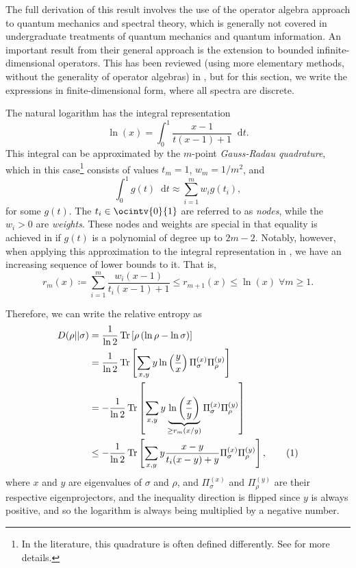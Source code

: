 \documentclass[10pt, a4paper]{article}
\numberwithin{equation}{section} %
\theoremstyle{definition}
\theoremstyle{plain}
\newcommand{\usenumber}{%
  \refstepcounter{equation}\tag{\theequation}
}
\newcommand{\dif}{\mathop{}\!\mathrm{d}} %
\newcommand{\?}{\mathrel{?}} %
\newcommand{\Tr}[2][]{\mathop{\mathrm{Tr}#1}\left[ #2 \right]} %
\begin{document}
    The full derivation of this result involves the use of the operator algebra approach to quantum mechanics and spectral theory, which is generally not covered in undergraduate treatments of quantum mechanics and quantum information. An important result from their general approach is the extension to bounded infinite-dimensional operators. This has been reviewed (using more elementary methods, without the generality of operator algebras) in , but for this section, we write the expressions in finite-dimensional form, where all spectra are discrete.

    The natural logarithm has the integral representation
    \begin{equation}
      \ln\left(x\right) = \int_{0}^{1} \frac{x-1}{t(x-1) + 1} \dif{t}.\label{eqn:integral_log}
    \end{equation}
    This integral can be approximated by the \(m\)-point \emph{Gauss-Radau quadrature}, which in this case\footnote{In the literature, this quadrature is often defined differently. See  for more details.} consists of values \(t_m = 1\), \(w_m = 1/m^2\), and
    \begin{equation}\label{eqn:grapprox}
      \int_{0}^{1} g(t) \dif{t} \approx \sum_{i=1}^m w_i g(t_i),
    \end{equation}
    for some \(g(t)\). The \(t_i \in \ocintv{0}{1}\) are referred to as \emph{nodes}, while the \(w_i > 0\) are \emph{weights}. These nodes and weights are special in that equality is achieved in  if \(g(t)\) is a polynomial of degree up to \(2m-2\). Notably, however, when applying this approximation to the integral representation in , we have an increasing sequence of lower bounds to it. That is,
    \begin{equation}
      r_m(x) \coloneqq \sum_{i=1}^m \frac{w_i(x-1)}{t_i(x-1) + 1} \leq r_{m+1}(x) \leq \ln\left(x\right) \;\forall m \geq 1.
    \end{equation}

    Therefore, we can write the relative entropy as
    \begin{align*}
      D(\rho||\sigma) &= \frac{1}{\ln 2} \Tr{\rho \left(\ln\rho - \ln\sigma\right) } \\
                      &= \frac{1}{\ln 2} \Tr{ \sum_{x,y} y \ln\left(\frac{y}{x}\right) \Pi^{(x)}_{\sigma} \Pi^{(y)}_{\rho}  } \label{eqn:finitedim_relent} \\ 
                      &= -\frac{1}{\ln 2} \Tr{ \sum_{x,y} y \underbrace{\ln\left(\frac{x}{y}\right)}_{\geq r_m(x/y)} \Pi^{(x)}_{\sigma} \Pi^{(y)}_{\rho} } \\
                      &\leq -\frac{1}{\ln 2} \Tr{ \sum_{x,y} y \frac{x-y}{t_i(x-y)+y} \Pi^{(x)}_{\sigma} \Pi^{(y)}_{\rho} }, \usenumber
    \end{align*}
    where \(x\) and \(y\) are eigenvalues of \(\sigma\) and \(\rho\), and \(\Pi^{(x)}_{\sigma}\) and \(\Pi^{(y)}_{\rho}\) are their respective eigenprojectors, and the inequality direction is flipped since \(y\) is always positive, and so the logarithm is always being multiplied by a negative number.
\end{document}
